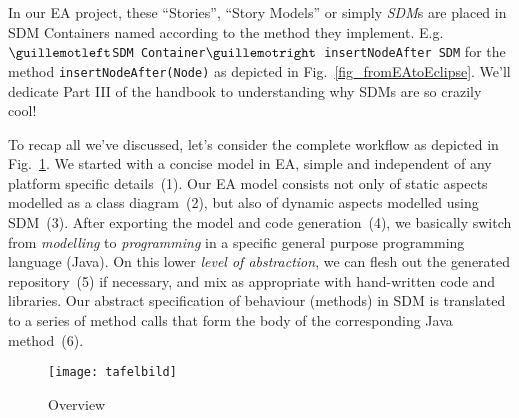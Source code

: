 In our EA project, these ``Stories'', ``Story Models'' or simply \emph{SDM}s are  placed in SDM Containers named according to the method they implement.
E.g.  \texttt{$\guillemotleft$SDM Container$\guillemotright$ insertNodeAfter SDM} for the method  \texttt{insertNodeAfter(Node)} as depicted in
Fig.~\ref{fig_fromEAtoEclipse}.  We'll dedicate Part III of the handbook to understanding why SDMs are so  {\huge crazily} cool!
 
To recap all we've discussed, let's consider the complete workflow as depicted in Fig.~\ref{fig_Overview}.
We started with a concise model in EA, simple and independent of any platform specific details~(1).  Our EA model consists not only of static aspects modelled
as a class diagram~(2), but also of dynamic aspects modelled using SDM~(3).  After exporting the model and code generation~(4), we basically switch from
\emph{modelling} to \emph{programming} in a specific general purpose programming language (Java).
On this lower \emph{level of abstraction}, we can flesh out the generated repository~(5) if necessary, and mix as appropriate with hand-written code and
libraries.  Our abstract specification of behaviour (methods) in SDM is translated to a series of method calls that form the body of the corresponding Java
method~(6).


\vspace{1.5cm}

\begin{figure}[htbp]
	\centering
  \texttt{[image: tafelbild]}
	\caption{Overview}
	\label{fig_Overview}
\end{figure}

\newpage